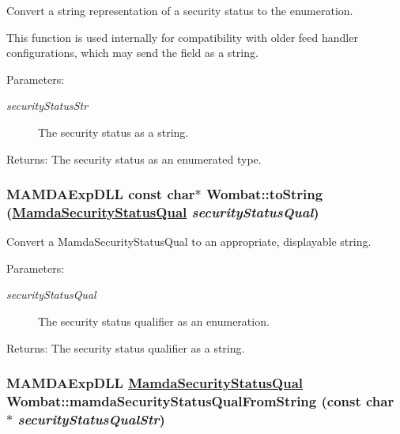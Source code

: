 Convert a string representation of a security status to the enumeration. 

This function is used internally for compatibility with older feed handler configurations, which may send the field as a string.

\begin{Desc}
\item[Parameters:]
\begin{description}
\item[{\em security\-Status\-Str}]The security status as a string.\end{description}
\end{Desc}
\begin{Desc}
\item[Returns:]The security status as an enumerated type. \end{Desc}
\hypertarget{namespaceWombat_ed8e0ddb79a8024079f6996d5ad411e1}{
\subsubsection[toString]{\setlength{\rightskip}{0pt plus 5cm}MAMDAExp\-DLL const char$\ast$ Wombat::to\-String (\hyperlink{namespaceWombat_2de6f22c731ba94169dc24b8054862b8}{Mamda\-Security\-Status\-Qual} {\em security\-Status\-Qual})}}
\label{namespaceWombat_ed8e0ddb79a8024079f6996d5ad411e1}


Convert a Mamda\-Security\-Status\-Qual to an appropriate, displayable string. 

\begin{Desc}
\item[Parameters:]
\begin{description}
\item[{\em security\-Status\-Qual}]The security status qualifier as an enumeration.\end{description}
\end{Desc}
\begin{Desc}
\item[Returns:]The security status qualifier as a string. \end{Desc}
\hypertarget{namespaceWombat_b257fbe7b1db6cbf114cdd340240d661}{
\subsubsection[mamdaSecurityStatusQualFromString]{\setlength{\rightskip}{0pt plus 5cm}MAMDAExp\-DLL \hyperlink{namespaceWombat_2de6f22c731ba94169dc24b8054862b8}{Mamda\-Security\-Status\-Qual} Wombat::mamda\-Security\-Status\-Qual\-From\-String (const char $\ast$ {\em security\-Status\-Qual\-Str})}}
\label{namespaceWombat_b257fbe7b1db6cbf114cdd340240d661}


